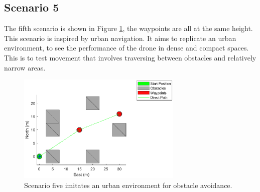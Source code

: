 \subsection{Scenario 5}
The fifth scenario is shown in Figure \ref{fig:3_3_scenario5}, the waypoints are all at the same height. This scenario is inspired by urban navigation. It aims to replicate an urban environment, to see the performance of the drone in dense and compact spaces. This is to test movement that involves traversing between obstacles and relatively narrow areas. 
\begin{figure}[H]
    \centering
    \includegraphics[width = 0.7\textwidth]{./img/3_3_scenario5}
    \caption{Scenario five imitates an urban environment for obstacle avoidance.}
    \label{fig:3_3_scenario5}
\end{figure}